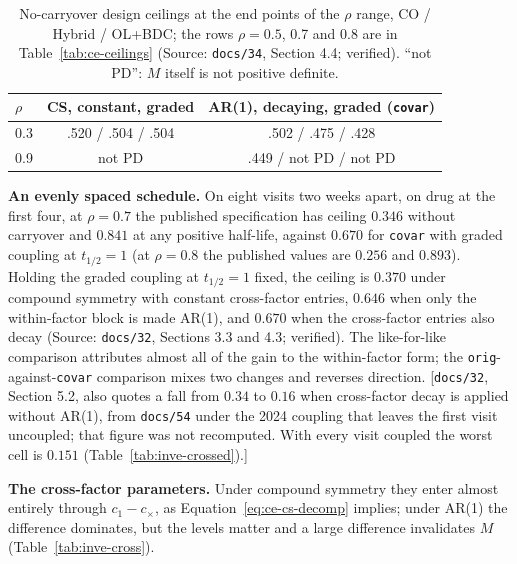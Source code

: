 \documentclass[11pt]{article}
\newcommand{\note}[1]{\textcolor{blue!60!black}{\small [#1]}}
\newcommand{\code}[1]{\texttt{#1}}
\begin{document}
\begin{table}[h]
\centering\small
\caption{No-carryover design ceilings at the end points of the $\rho$
range, CO / Hybrid / OL+BDC; the rows $\rho = 0.5$, 0.7 and 0.8 are in
Table~\ref{tab:ce-ceilings} (Source: \code{docs/34}, Section 4.4;
verified). ``not PD'': $M$ itself is not positive definite.}
\label{tab:inve-rho}
\begin{tabular}{@{}lcc@{}}
\toprule
$\rho$ & CS, constant, graded & AR(1), decaying, graded (\code{covar}) \\
\midrule
0.3 & .520 / .504 / .504 & .502 / .475 / .428 \\
0.9 & not PD & .449 / not PD / not PD \\
\bottomrule
\end{tabular}
\end{table}

\textbf{An evenly spaced schedule.} On eight visits two weeks apart, on
drug at the first four, at $\rho = 0.7$ the published specification has
ceiling $0.346$ without carryover and $0.841$ at any positive
half-life, against $0.670$ for \code{covar} with graded coupling at
$t_{1/2} = 1$ (at $\rho = 0.8$ the published values are $0.256$ and
$0.893$). Holding the graded coupling at $t_{1/2} = 1$ fixed, the
ceiling is $0.370$ under compound symmetry with constant cross-factor
entries, $0.646$ when only the within-factor block is made AR(1), and
$0.670$ when the cross-factor entries also decay (Source:
\code{docs/32}, Sections 3.3 and 4.3; verified). The like-for-like
comparison attributes almost all of the gain to the within-factor form;
the \code{orig}-against-\code{covar} comparison mixes two changes and
reverses direction. \note{\code{docs/32}, Section 5.2, also quotes a
fall from $0.34$ to $0.16$ when cross-factor decay is applied without
AR(1), from \code{docs/54} under the 2024
coupling that leaves the first visit uncoupled; that figure was not
recomputed. With every visit coupled the worst cell is $0.151$
(Table~\ref{tab:inve-crossed}).}

\textbf{The cross-factor parameters.} Under compound symmetry they
enter almost entirely through $c_1 - c_\times$, as
Equation~\eqref{eq:ce-cs-decomp} implies; under AR(1) the difference
dominates, but the levels matter and a large difference invalidates $M$
(Table~\ref{tab:inve-cross}).
\end{document}
